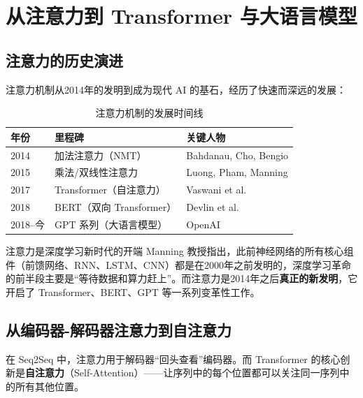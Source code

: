 \documentclass[a4paper]{article}
\begin{document}

\section{从注意力到 Transformer 与大语言模型}

\subsection{注意力的历史演进}

注意力机制从2014年的发明到成为现代 AI 的基石，经历了快速而深远的发展：

\begin{table}[H]
\centering
\begin{tabular}{lll}
\toprule
\textbf{年份} & \textbf{里程碑} & \textbf{关键人物} \\
\midrule
2014 & 加法注意力（NMT） & Bahdanau, Cho, Bengio \\
2015 & 乘法/双线性注意力 & Luong, Pham, Manning \\
2017 & Transformer（自注意力） & Vaswani et al. \\
2018 & BERT（双向 Transformer） & Devlin et al. \\
2018--今 & GPT 系列（大语言模型） & OpenAI \\
\bottomrule
\end{tabular}
\caption{注意力机制的发展时间线}
\end{table}

\begin{importantbox}{注意力是深度学习新时代的开端}
Manning 教授指出，此前神经网络的所有核心组件（前馈网络、RNN、LSTM、CNN）都是在2000年之前发明的，深度学习革命的前半段主要是``等待数据和算力赶上''。而注意力是2014年之后\textbf{真正的新发明}，它开启了 Transformer、BERT、GPT 等一系列变革性工作。
\end{importantbox}

\subsection{从编码器-解码器注意力到自注意力}

在 Seq2Seq 中，注意力用于解码器``回头查看''编码器。而 Transformer 的核心创新是\textbf{自注意力}（Self-Attention）——让序列中的每个位置都可以关注同一序列中的所有其他位置。
\end{document}
